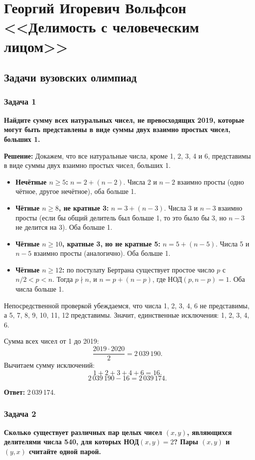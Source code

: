 \documentclass[12pt, a4paper]{article}
\begin{document}
\section*{Георгий Игоревич Вольфсон <<Делимость с человеческим лицом>>}

\subsection*{Задачи вузовских олимпиад}

\subsubsection*{Задача 1}
\textbf{Найдите сумму всех натуральных чисел, не превосходящих 2019, которые могут быть представлены в виде суммы двух взаимно простых чисел, больших 1.}

\textbf{Решение:}
Докажем, что все натуральные числа, кроме 1, 2, 3, 4 и 6, представимы в виде суммы двух взаимно простых чисел, больших 1.

\begin{itemize}
    \item \textbf{Нечётные $n \ge 5$:} $n = 2 + (n-2)$. Числа 2 и $n-2$ взаимно просты (одно чётное, другое нечётное), оба больше 1.
    \item \textbf{Чётные $n \ge 8$, не кратные 3:} $n = 3 + (n-3)$. Числа 3 и $n-3$ взаимно просты (если бы общий делитель был больше 1, то это было бы 3, но $n-3$ не делится на 3). Оба больше 1.
    \item \textbf{Чётные $n \ge 10$, кратные 3, но не кратные 5:} $n = 5 + (n-5)$. Числа 5 и $n-5$ взаимно просты (аналогично). Оба больше 1.
    \item \textbf{Чётные $n \ge 12$:} по постулату Бертрана существует простое число $p$ с $n/2 < p < n$. Тогда $p \nmid n$, и $n = p + (n-p)$, где $\text{НОД}(p, n-p) = 1$. Оба числа больше 1.
\end{itemize}

Непосредственной проверкой убеждаемся, что числа 1, 2, 3, 4, 6 не представимы, а 5, 7, 8, 9, 10, 11, 12 представимы. Значит, единственные исключения: 1, 2, 3, 4, 6.

Сумма всех чисел от 1 до 2019:
\[
\frac{2019 \cdot 2020}{2} = 2\,039\,190.
\]
Вычитаем сумму исключений:
\[
1+2+3+4+6 = 16.
\]
\[
2\,039\,190 - 16 = 2\,039\,174.
\]

\textbf{Ответ:} 2\,039\,174.

\subsubsection*{Задача 2}
\textbf{Сколько существует различных пар целых чисел $(x,y)$, являющихся делителями числа 540, для которых НОД$(x, y) = 2$? Пары $(x,y)$ и $(y,x)$ считайте одной парой.}
\end{document}
